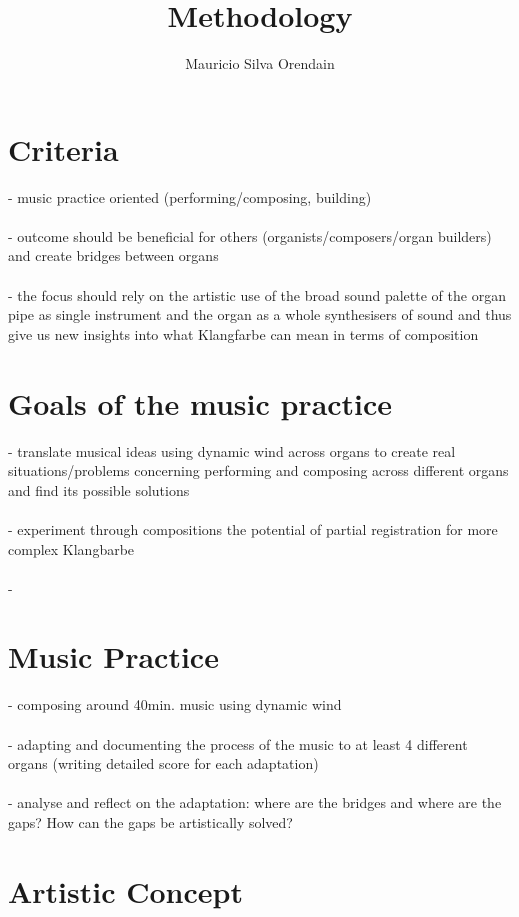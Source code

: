 \documentclass[11pt, oneside]{article}   	%
\title{Methodology}
\author{Mauricio Silva Orendain}
\begin{document}
\maketitle

\section{Criteria}

- music practice oriented (performing/composing, building)\\
\\
- outcome should be beneficial for others (organists/composers/organ builders) and create bridges between organs\\
\\
- the focus should rely on the artistic use of the broad sound palette of the organ pipe as single instrument and the organ as a whole synthesisers of sound and thus give us new insights into what Klangfarbe can mean in terms of composition \\
\section{Goals of the music practice}

- translate musical ideas using dynamic wind across organs to create real situations/problems concerning performing and composing across different organs and find its possible solutions\\
\\
- experiment through compositions the potential of partial registration for more complex Klangbarbe\\
\\
- 
\section{Music Practice}

- composing around 40min. music using dynamic wind\\
\\
- adapting and documenting the process of the music to at least 4 different organs (writing detailed score for each adaptation)\\
\\
- analyse and reflect on the adaptation: where are the bridges and where are the gaps? How can the gaps be artistically solved?

\section{Artistic Concept}
\end{document}
